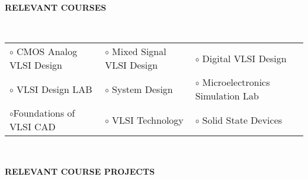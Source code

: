 \documentclass[a4paper,10pt]{article}
\begin{document}
 \colorbox{titleColor}{\parbox{6.5in}{\textbf{RELEVANT COURSES}}}\\
 
 \begin{tabular}{p{2in}p{2in}p{2.5in}}

$\circ$ CMOS Analog VLSI Design &$\circ$ Mixed Signal VLSI Design &$\circ$ Digital VLSI Design\\
$\circ$ VLSI Design LAB &$\circ$ System Design &$\circ$ Microelectronics Simulation Lab\\
$\circ$Foundations of VLSI CAD  &$\circ$ VLSI Technology &$\circ$ Solid State Devices
\end{tabular}\\

 \colorbox{titleColor}{\parbox{6.5in}{\textbf{RELEVANT COURSE PROJECTS}}}
\end{document}
